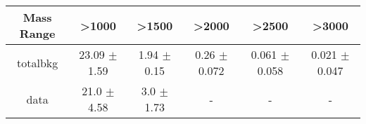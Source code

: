 \begin{footnotesize} 
\begin{tabular}{c|c|c|c|c|c} 
Mass Range & >1000 & >1500 & >2000 & >2500 & >3000 \\ 
\hline\hline 
totalbkg & 23.09 $\pm$ 1.59 & 1.94 $\pm$ 0.15 & 0.26 $\pm$ 0.072 & 0.061 $\pm$ 0.058 & 0.021 $\pm$ 0.047\\ 
data & 21.0 $\pm$ 4.58 & 3.0 $\pm$ 1.73 &  -  &  -  &  - \\ 
\hline\hline 
\end{tabular} 
\end{footnotesize} 
\newline 
